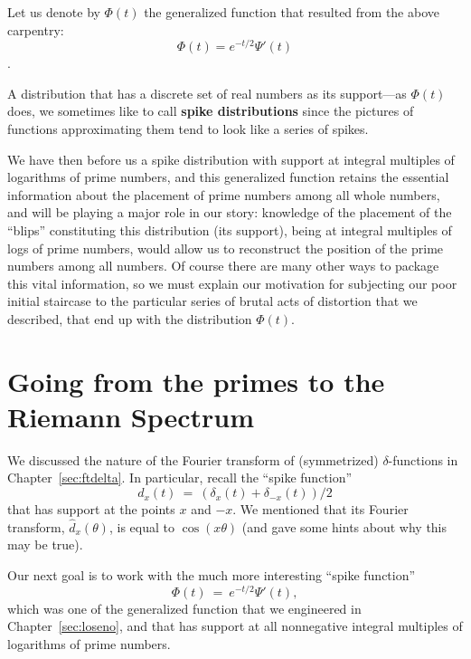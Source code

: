 \documentclass[openany]{book}
\theoremstyle{plain}
\theoremstyle{definition}
\newcommand{\todo}[1]{\par\vspace{1em}{\small---------\\{{\bf To be done:} #1}\\-----------}\par\vspace{1em}}
\begin{document}
{{{Let us denote by $\Phi(t)$ the generalized function that resulted from the above carpentry:
  $$\Phi(t) = e^{-t/2}\Psi'(t)$$
}.%


A distribution that has a discrete set of real numbers as its
  support---as $\Phi(t)$ does, we sometimes like to call {\bf spike
    distributions} since the pictures of functions approximating them
  tend to look like a series of spikes.

  We have then before us a spike distribution with support at integral
  multiples of logarithms of prime numbers, and this generalized
  function retains the essential information about the placement of
  prime numbers among all whole numbers, and will be playing a major
  role in our story: knowledge of the placement of the ``blips'' constituting this distribution (its
support), being at  integral multiples of logs of prime numbers, would allow us to reconstruct the position of the prime
numbers among all numbers. Of course there are many other ways to package this vital information, so we
must explain our motivation for subjecting our poor initial staircase
to the particular series of brutal acts of distortion that we
described, that end up with the distribution $\Phi(t)$.







\chapter{Going from the primes to the Riemann Spectrum}
\label{ch:prime-to-spectrum}



We  discussed the nature of the Fourier transform of (symmetrized)
$\delta$-functions in Chapter~\ref{sec:ftdelta}. In particular, recall
the ``spike function'' $$d_x(t) \ = \ (\delta_x(t) +
\delta_{-x}(t))/2$$ that has support at the points $x$ and $-x$.  We
mentioned that its Fourier transform, ${\hat d}_x(\theta)$, is equal
to $\cos(x\theta)$ (and gave some hints about why this may be true).


Our next goal is to work with the much more interesting ``spike
function'' $$\Phi(t) \ = \ e^{- t/2}\Psi'(t),$$ which was one of the
generalized function that we engineered in Chapter~\ref{sec:loseno},
and that has support at all nonnegative integral multiples of
logarithms of prime numbers.




}}
\end{document}
